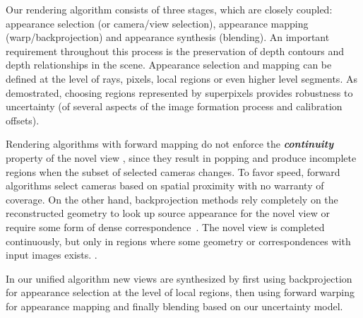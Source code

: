 

Our rendering algorithm consists of three stages, which are closely coupled:
appearance selection (or camera/view selection), 
appearance mapping (warp/backprojection) and appearance synthesis (blending). 
An important requirement throughout this process is the preservation 
of depth contours and depth relationships in the scene.
Appearance selection and mapping can be defined at the level of rays, pixels,
local regions or even higher level segments. 
As \cite{Zitnick:2004:viewinterp} demostrated, choosing regions represented by superpixels provides robustness to uncertainty
(of several aspects of the image formation process and calibration
offsets).

Rendering algorithms with forward mapping do not enforce the 
\textbf{\emph{continuity}}
property of the novel view \cite{ULR}, since they 
result in popping and produce incomplete regions when the subset
of selected cameras changes.
To favor speed, forward algorithms select cameras based on spatial proximity with no warranty
of coverage. 
On the other hand, backprojection methods %
rely completely on the reconstructed geometry to look up source appearance
for the novel view or require some form of dense correspondence~\cite{dibr}. 
The novel view is completed continuously, but only in 
regions where some geometry or correspondences with input images exists. . 

In our unified algorithm new views are synthesized by first using 
backprojection for appearance selection at the level of local regions, 
then using forward warping for appearance mapping and finally
blending based on our uncertainty model.


